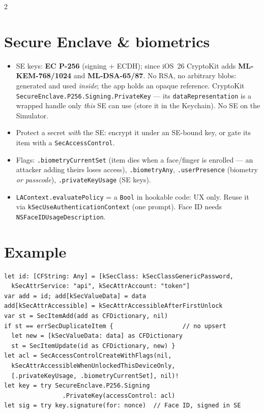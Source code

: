 \documentclass[8pt]{extarticle}
\begin{document}
\begin{multicols}{2}
\section{Secure Enclave \& biometrics}
\begin{itemize}
  \item SE keys: \textbf{EC P-256} (signing + ECDH); since iOS~26 CryptoKit
        adds \textbf{ML-KEM-768/1024} and \textbf{ML-DSA-65/87}. No RSA, no
        arbitrary blobs: generated and used \emph{inside}; the app holds an
        opaque reference.
        CryptoKit \texttt{SecureEnclave.P256.Signing.PrivateKey} — its
        \texttt{dataRepresentation} is a wrapped handle only \emph{this} SE
        can use (store it in the Keychain). No SE on the Simulator.
  \item Protect a secret \emph{with} the SE: encrypt it under an SE-bound
        key, or gate its item with a \texttt{SecAccessControl}.
  \item Flags: \texttt{.biometryCurrentSet} (item dies when a face/finger is
        enrolled — an attacker adding theirs loses access), \texttt{.biometryAny},
        \texttt{.userPresence} (biometry \emph{or passcode}),
        \texttt{.privateKeyUsage} (SE keys).
  \item \texttt{LAContext.evaluatePolicy} = a \texttt{Bool} in hookable code:
        UX only. Reuse it via \texttt{kSecUseAuthenticationContext} (one
        prompt). Face ID needs \texttt{NSFaceIDUsageDescription}.
\end{itemize}

\section{Example}
\begin{lstlisting}[language=SwiftSheet]
let id: [CFString: Any] = [kSecClass: kSecClassGenericPassword,
  kSecAttrService: "api", kSecAttrAccount: "token"]
var add = id; add[kSecValueData] = data
add[kSecAttrAccessible] = kSecAttrAccessibleAfterFirstUnlock
var st = SecItemAdd(add as CFDictionary, nil)
if st == errSecDuplicateItem {                   // no upsert
  let new = [kSecValueData: data] as CFDictionary
  st = SecItemUpdate(id as CFDictionary, new) }
let acl = SecAccessControlCreateWithFlags(nil,
  kSecAttrAccessibleWhenUnlockedThisDeviceOnly,
  [.privateKeyUsage, .biometryCurrentSet], nil)!
let key = try SecureEnclave.P256.Signing
                .PrivateKey(accessControl: acl)
let sig = try key.signature(for: nonce)  // Face ID, signed in SE
\end{lstlisting}


\end{multicols}
\end{document}
